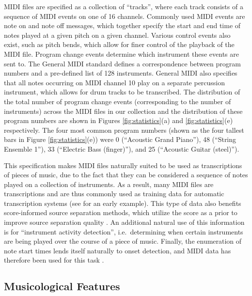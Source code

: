 \documentclass{article}
\begin{document}
MIDI files are specified as a collection of ``tracks'', where each track consists of a sequence of MIDI events on one of 16 channels.
Commonly used MIDI events are note on and note off messages, which together specify the start and end time of notes played at a given pitch on a given channel.
Various control events also exist, such as pitch bends, which allow for finer control of the playback of the MIDI file.
Program change events determine which instrument these events are sent to.
The General MIDI standard defines a correspondence between program numbers and a pre-defined list of 128 instruments.
General MIDI also specifies that all notes occurring on MIDI channel 10 play on a separate percussion instrument, which allows for drum tracks to be transcribed.
The distribution of the total number of program change events (corresponding to the number of instruments) across the MIDI files in our collection and the distribution of these program numbers are shown in Figures \ref{fig:statistics}(a) and \ref{fig:statistics}(e) respectively.
The four most common program numbers (shown as the four tallest bars in Figure \ref{fig:statistics}(e)) were 0 (``Acoustic Grand Piano''), 48 (``String Ensemble 1''), 33 (``Electric Bass (finger)''), and 25 (``Acoustic Guitar (steel)'').

This specification makes MIDI files naturally suited to be used as transcriptions of pieces of music, due to the fact that they can be considered a sequence of notes played on a collection of instruments.
As a result, many MIDI files are transcriptions and are thus commonly used as training data for automatic transcription systems (see \cite{turetsky2003ground} for an early example).
This type of data also benefits score-informed source separation methods, which utilize the score as a prior to improve source separation quality \cite{ewert2014score}.
An additional natural use of this information is for ``instrument activity detection'', i.e.\ determining when certain instruments are being played over the course of a piece of music.
Finally, the enumeration of note start times lends itself naturally to onset detection, and MIDI data has therefore been used for this task \cite{bello2005tutorial}.

\subsection{Musicological Features}
\end{document}

